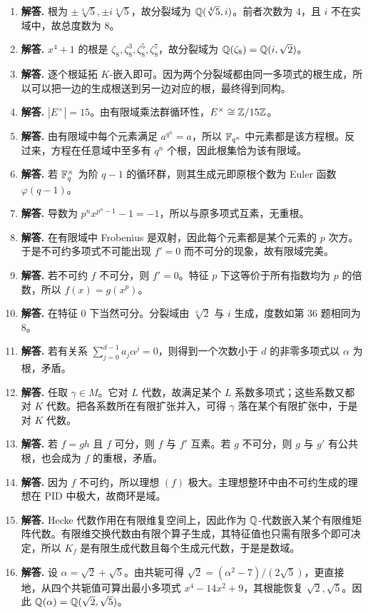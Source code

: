 \begin{enumerate}[label=\textbf{\arabic*.}, leftmargin=*, itemsep=1em]
\item \textbf{解答.} 根为 $\pm\sqrt[4]{5},\pm i\sqrt[4]{5}$，故分裂域为 $\mathbb{Q}(\sqrt[4]{5},i)$。前者次数为 $4$，且 $i$ 不在实域中，故总度数为 $8$。
\item \textbf{解答.} $x^4+1$ 的根是 $\zeta_8,\zeta_8^3,\zeta_8^5,\zeta_8^7$，故分裂域为 $\mathbb{Q}(\zeta_8)=\mathbb{Q}(i,\sqrt2)$。
\item \textbf{解答.} 逐个根延拓 $K$-嵌入即可。因为两个分裂域都由同一多项式的根生成，所以可以把一边的生成根送到另一边对应的根，最终得到同构。
\item \textbf{解答.} $|E^\times|=15$。由有限域乘法群循环性，$E^\times\cong \mathbb{Z}/15\mathbb{Z}$。
\item \textbf{解答.} 由有限域中每个元素满足 $a^{q^n}=a$，所以 $\mathbb{F}_{q^n}$ 中元素都是该方程根。反过来，方程在任意域中至多有 $q^n$ 个根，因此根集恰为该有限域。
\item \textbf{解答.} 若 $\mathbb{F}_q^\times$ 为阶 $q-1$ 的循环群，则其生成元即原根个数为 Euler 函数 $\varphi(q-1)$。
\item \textbf{解答.} 导数为 $p^n x^{p^n-1}-1=-1$，所以与原多项式互素，无重根。
\item \textbf{解答.} 在有限域中 Frobenius 是双射，因此每个元素都是某个元素的 $p$ 次方。于是不可约多项式不可能出现 $f'=0$ 而不可分的现象，故有限域完美。
\item \textbf{解答.} 若不可约 $f$ 不可分，则 $f'=0$。特征 $p$ 下这等价于所有指数均为 $p$ 的倍数，所以 $f(x)=g(x^p)$。
\item \textbf{解答.} 在特征 $0$ 下当然可分。分裂域由 $\sqrt[4]{2}$ 与 $i$ 生成，度数如第 36 题相同为 $8$。
\item \textbf{解答.} 若有关系 $\sum_{j=0}^{d-1}a_j\alpha^j=0$，则得到一个次数小于 $d$ 的非零多项式以 $\alpha$ 为根，矛盾。
\item \textbf{解答.} 任取 $\gamma\in M$。它对 $L$ 代数，故满足某个 $L$ 系数多项式；这些系数又都对 $K$ 代数。把各系数所在有限扩张并入，可得 $\gamma$ 落在某个有限扩张中，于是对 $K$ 代数。
\item \textbf{解答.} 若 $f=gh$ 且 $f$ 可分，则 $f$ 与 $f'$ 互素。若 $g$ 不可分，则 $g$ 与 $g'$ 有公共根，也会成为 $f$ 的重根，矛盾。
\item \textbf{解答.} 因为 $f$ 不可约，所以理想 $(f)$ 极大。主理想整环中由不可约生成的理想在 PID 中极大，故商环是域。
\item \textbf{解答.} Hecke 代数作用在有限维复空间上，因此作为 $\mathbb{Q}$-代数嵌入某个有限维矩阵代数。有限维交换代数由有限个算子生成，其特征值也只需有限多个即可决定，所以 $K_f$ 是有限生成代数且每个生成元代数，于是是数域。
\item \textbf{解答.} 设 $\alpha=\sqrt2+\sqrt5$。由共轭可得 $\sqrt2=(\alpha^2-7)/(2\sqrt5)$，更直接地，从四个共轭值可算出最小多项式 $x^4-14x^2+9$，其根能恢复 $\sqrt2,\sqrt5$。因此 $\mathbb{Q}(\alpha)=\mathbb{Q}(\sqrt2,\sqrt5)$。

\end{enumerate}
